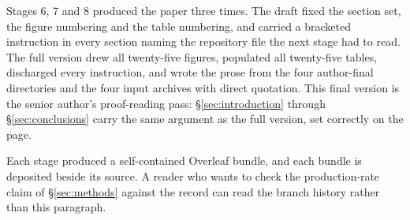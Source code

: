 Stages 6, 7 and 8 produced the paper three times. The draft fixed the section
set, the figure numbering and the table numbering, and carried a bracketed
instruction in every section naming the repository file the next stage had to
read. The full version drew all twenty-five figures, populated all twenty-five
tables, discharged every instruction, and wrote the prose from the four
author-final  directories and the four input archives with
direct quotation. This final version is the senior author's proof-reading pass:
\S\ref{sec:introduction} through \S\ref{sec:conclusions} carry the same argument
as the full version, set correctly on the page.

Each stage produced a self-contained Overleaf bundle, and each bundle is
deposited beside its source. A reader who wants to check the production-rate
claim of \S\ref{sec:methods} against the record can read the branch history
rather than this paragraph.
